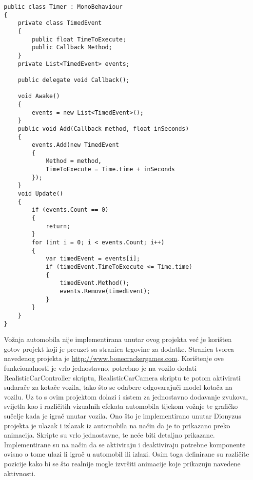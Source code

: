 \begin{lstlisting}[caption={Odbrojavač}, label=Timer]
public class Timer : MonoBehaviour
{
    private class TimedEvent
    {
        public float TimeToExecute;
        public Callback Method;
    }
    private List<TimedEvent> events;

    public delegate void Callback();

    void Awake()
    {
        events = new List<TimedEvent>();
    }
    public void Add(Callback method, float inSeconds)
    {
        events.Add(new TimedEvent
        {
            Method = method,
            TimeToExecute = Time.time + inSeconds
        });
    }
    void Update()
    {
        if (events.Count == 0)
        {
            return;
        }
        for (int i = 0; i < events.Count; i++)
        {
            var timedEvent = events[i];
            if (timedEvent.TimeToExecute <= Time.time)
            {
                timedEvent.Method();
                events.Remove(timedEvent);
            }
        }
    }
}
\end{lstlisting}
Vožnja automobila nije implementirana unutar ovog projekta već je korišten gotov projekt koji je preuzet sa stranica trgovine za dodatke. Stranica tvorca navedenog projekta je \url{http://www.bonecrackergames.com}. Korištenje ove funkcionalnosti je vrlo jednostavno, potrebno je na vozilo dodati RealisticCarController skriptu, RealisticCarCamera skriptu te potom aktivirati sudarače za kotače vozila, tako što se odabere odgovarajuči model kotača na vozilu. Uz to s ovim projektom dolazi i sistem za jednostavno dodavanje zvukova, svijetla kao i različitih vizualnih efekata automobila tijekom vožnje te grafičko sučelje kada je igrač unutar vozila.
Ono što je implementirano unutar Dionyzus projekta je ulazak i izlazak iz automobila na način da je to prikazano preko animacija. Skripte su vrlo jednostavne, te neće biti detaljno prikazane. Implementirane su na način da se aktiviraju i deaktiviraju potrebne komponente ovisno o tome ulazi li igrač u automobil ili izlazi. Osim toga definirane su različite pozicije kako bi se što realnije mogle izvršiti animacije koje prikazuju navedene aktivnosti.
 
